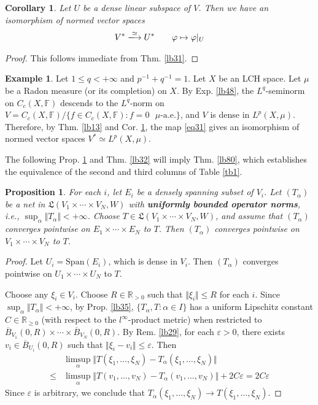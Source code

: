 \documentclass[12pt,b5paper,notitlepage]{article}
\theoremstyle{definition}
\newtheorem{eg}[df]{Example}
\theoremstyle{plain}
\newtheorem{pp}[df]{Proposition}
\newtheorem{co}[df]{Corollary}
\newcommand{\fk}{\mathfrak}
\newcommand{\ovl}{\overline}
\newcommand{\Span}{\mathrm{Span}}
\newcommand{\Rbb}{\mathbb R}
\newcommand{\Fbb}{\mathbb F}
\newcommand{\eps}{\varepsilon}
\numberwithin{equation}{section}
\begin{document}
\begin{co}\label{lb44}
Let $U$ be a dense linear subspace of $V$. Then we have an isomorphism of normed vector spaces
\begin{gather}
V^*\xlongrightarrow{\simeq} U^*\qquad \varphi\mapsto\varphi|_U
\end{gather}
\end{co}

\begin{proof}
This follows immediate from Thm. \ref{lb31}.
\end{proof}

\begin{eg}\label{lb49}
Let $1\leq q<+\infty$ and $p^{-1}+q^{-1}=1$. Let $X$ be an LCH space. Let $\mu$ be a Radon measure (or its completion) on $X$. By Exp. \ref{lb48}, the $L^q$-seminorm on $C_c(X,\Fbb)$ descends to the $L^q$-norm on $V=C_c(X,\Fbb)/\{f\in C_c(X,\Fbb):f=0\text{ $\mu$-a.e.}\}$, and $V$ is dense in $L^p(X,\mu)$. Therefore, by Thm. \ref{lb13} and Cor. \ref{lb44}, the map \eqref{eq31} gives an isomorphism of normed vector spaces $V^*\simeq L^p(X,\mu)$.
\end{eg}

The following Prop. \ref{lb73} and Thm. \ref{lb32} will imply Thm. \ref{lb80}, which establishes the equivalence of the second and third columns of Table \ref{tb1}.

\begin{pp}\label{lb73}
For each $i$, let $E_i$ be a densely spanning subset of $V_i$. Let $(T_\alpha)$ be a net in $\fk L(V_1\times\cdots\times V_N,W)$ with \textbf{uniformly bounded operator norms},  i.e., $\sup_\alpha\Vert T_\alpha\Vert<+\infty$. Choose $T\in\fk L(V_1\times\cdots\times V_N,W)$, and assume that $(T_\alpha)$ converges pointwise on $E_1\times\cdots\times E_N$ to $T$. Then $(T_\alpha)$ converges pointwise on $V_1\times\cdots\times V_N$ to $T$.
\end{pp}

\begin{proof}
Let $U_i=\Span(E_i)$, which is dense in $V_i$. Then $(T_\alpha)$ converges pointwise on $U_1\times\cdots\times U_N$ to $T$.

Choose any $\xi_i\in V_i$. Choose $R\in\Rbb_{>0}$ such that $\Vert\xi_i\Vert\leq R$ for each $i$. Since $\sup_\alpha\Vert T_\alpha\Vert<+\infty$, by Prop. \ref{lb35}, $\{T_\alpha,T:\alpha\in I\}$ has a uniform Lipschitz constant $C\in \Rbb_{\geq0}$ (with respect to the $l^\infty$-product metric) when restricted to $\ovl B_{V_1}(0,R)\times\cdots\times \ovl B_{V_N}(0,R)$. By Rem. \ref{lb29}, for each $\eps>0$, there exists $v_i\in\ovl B_{U_i}(0,R)$ such that $\Vert \xi_i-v_i\Vert\leq\eps$. Then
\begin{align*}
&\limsup_\alpha \Vert T(\xi_1,\dots,\xi_N)-T_\alpha(\xi_1,\dots,\xi_N)\Vert\\
\leq&\limsup_\alpha \Vert T(v_1,\dots,v_N)-T_\alpha(v_1,\dots,v_N)\Vert+2C\eps=2C\eps
\end{align*}
Since $\eps$ is arbitrary, we conclude that $T_\alpha(\xi_1,\dots,\xi_N)\rightarrow T(\xi_1,\dots,\xi_N)$.
\end{proof}
\end{document}
